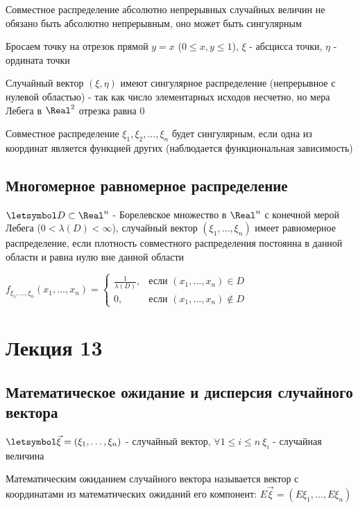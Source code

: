 \documentclass[12pt]{article}
\begin{document}
    \Nota Совместное распределение абсолютно непрерывных случайных величин не обязано быть абсолютно непрерывным, оно может быть сингулярным

    \Exs Бросаем точку на отрезок прямой $y = x$ ($0 \leq x, y \leq 1$), $\xi$ - абсцисса точки, $\eta$ - ордината точки

    Случайный вектор $(\xi, \eta)$ имеют сингулярное распределение (непрерывное с нулевой областью) - 
    так как число элементарных исходов несчетно, но мера Лебега в $\Real^2$ отрезка равна 0

    \Nota Совместное распределение $\xi_1, \xi_2, \dots, \xi_n$ будет сингулярным, если одна из координат является функцией других (наблюдается функциональная зависимость)

    \subsection{Многомерное равномерное распределение}

    \Def $\letsymbol D \subset \Real^n$ - Борелевское множество в $\Real^n$ с конечной мерой Лебега ($0 < \lambda(D) < \infty$),
    случайный вектор $(\xi_1, \dots, \xi_n)$ имеет равномерное распределение, если плотность совместного распределения 
    постоянна в данной области и равна нулю вне данной области

    $f_{\xi_1, \dots, \xi_n}(x_1, \dots, x_n) = \begin{cases}\frac{1}{\lambda(D)}, & \text{если } (x_1, \dots, x_n) \in D \\ 0, & \text{если } (x_1, \dots, x_n) \not\in D\end{cases}$


    \section{Лекция 13}

    \subsection{Математическое ожидание и дисперсия случайного вектора}
    
    $\letsymbol \vec{\xi} = (\xi_1, \dots, \xi_n)$ - случайный вектор, 
    $\forall 1 \leq i \leq n \ \xi_i$ - случайная величина

    \Def Математическим ожиданием случайного вектора называется вектор с координатами 
    из математических ожиданий его компонент: $E\vec{\xi} = (E\xi_1, \dots, E\xi_n)$
\end{document}
